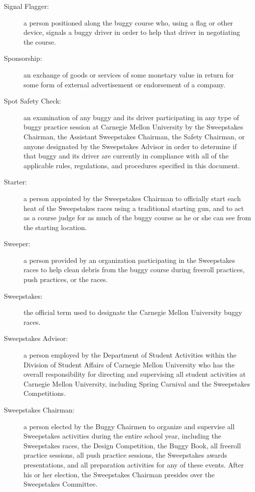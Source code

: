 \begin{description}
	\item[Signal Flagger:]
	a person positioned along the buggy course who, using a flag or other device, signals a buggy driver in order to help that driver in negotiating the course.

	\item[Sponsorship:]
	an exchange of goods or services of some monetary value in return for some form of external advertisement or endorsement of a company.

	\item[Spot Safety Check:]
	an examination of any buggy and its driver participating in any type of buggy practice session at Carnegie Mellon University by the Sweepstakes Chairman, the Assistant Sweepstakes Chairman, the Safety Chairman, or anyone designated by the Sweepstakes Advisor in order to determine if that buggy and its driver are currently in compliance with all of the applicable rules, regulations, and procedures specified in this document.

	\item[Starter:]
	a person appointed by the Sweepstakes Chairman to officially start each heat of the Sweepstakes races using a traditional starting gun, and to act as a course judge for as much of the buggy course as he or she can see from the starting location.

	\item[Sweeper:]
	a person provided by an organization participating in the Sweepstakes races to help clean debris from the buggy course during freeroll practices, push practices, or the races.

	\item[Sweepstakes:]
	the official term used to designate the Carnegie Mellon University buggy races.

	\item[Sweepstakes Advisor:]
	a person employed by the Department of Student Activities within the Division of Student Affairs of Carnegie Mellon University who has the overall responsibility for directing and supervising all student activities at Carnegie Mellon University, including Spring Carnival and the Sweepstakes Competitions.

	\item[Sweepstakes Chairman:]
	a person elected by the Buggy Chairmen to organize and supervise all Sweepstakes activities during the entire school year, including the Sweepstakes races, the Design Competition, the Buggy Book, all freeroll practice sessions, all push practice sessions, the Sweepstakes awards presentations, and all preparation activities for any of these events. After his or her election, the Sweepstakes Chairman presides over the Sweepstakes Committee.


\end{description}
